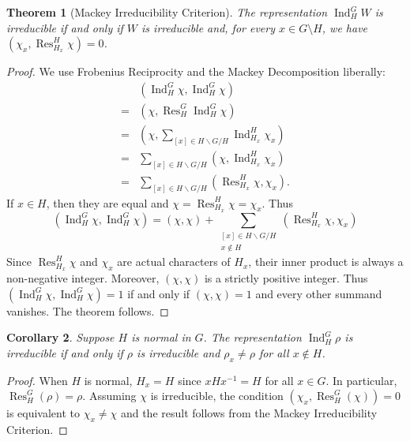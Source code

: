 \documentclass[12pt]{article}
\theoremstyle{plain}
\newtheorem{theorem}{Theorem}[section]
\newtheorem{corollary}[theorem]{Corollary}
\theoremstyle{definition}
\theoremstyle{remark}
\numberwithin{equation}{section}
\begin{document}
\begin{theorem}[Mackey Irreducibility Criterion]
The representation $\operatorname{Ind}^G_H W$ is irreducible
if and only if $W$ is irreducible and,
for every $x \in G \setminus H$,
we have $( \chi_x, \operatorname{Res}^H_{H_x} \chi )=0$.
\end{theorem}

\begin{proof}
We use Frobenius Reciprocity and the Mackey Decomposition liberally:
\begin{align*}
&( \operatorname{Ind}^G_H \chi, \operatorname{Ind}^G_H \chi )\\
=&( \chi, \operatorname{Res}^G_H \operatorname{Ind}^G_H \chi )\\
=&( \chi, \sum_{[x] \in H\backslash G / H}
\operatorname{Ind}_{H_x}^H \chi_x )\\
=&\sum_{[x] \in H\backslash G / H} ( \chi, 
\operatorname{Ind}_{H_x}^H \chi_x )\\
=&\sum_{[x] \in H\backslash G / H} ( \operatorname{Res}_{H_x}^H\chi, 
 \chi_x ).
\end{align*}
If $x \in H$, then they are equal and
$\chi=\operatorname{Res}_{H_x}^H\chi = \chi_x$.
Thus
\[
( \operatorname{Ind}^G_H \chi, \operatorname{Ind}^G_H \chi )
=(\chi,\chi)+
\sum_{\substack{[x] \in H\backslash G / H\\x \not\in  H}}
( \operatorname{Res}_{H_x}^H\chi,  \chi_x )
\]
Since $\operatorname{Res}_{H_x}^H\chi$ and $\chi_x$ are actual
characters of $H_x$, their inner product is always a non-negative integer.
Moreover, $(\chi,\chi)$ is a strictly positive integer.
Thus
$( \operatorname{Ind}^G_H \chi, \operatorname{Ind}^G_H \chi )=1$
if and only if $(\chi,\chi)=1$ and every other
summand vanishes.
The theorem follows.
\end{proof}

\begin{corollary}
Suppose $H$ is normal in $G$.
The representation $\operatorname{Ind}^G_H \rho$ is irreducible
if and only if $\rho$ is irreducible and $\rho_x \ne \rho$
for all $x \not\in H$.
\end{corollary}

\begin{proof}
When $H$ is normal, $H_x=H$ since $xHx^{-1}=H$ for all $x \in G$.
In particular, $\operatorname{Res}^G_H(\rho)=\rho$.
Assuming $\chi$ is irreducible, the condition
$\left(\chi_x,\operatorname{Res}^G_H(\chi)\right)=0$
is equivalent to $\chi_x \ne \chi$ and the result follows from
the Mackey Irreducibility Criterion.
\end{proof}
\end{document}
